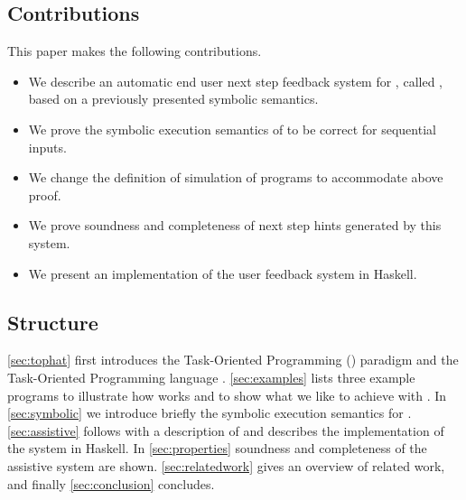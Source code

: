 \subsection{Contributions}

This paper makes the following contributions.

\begin{itemize}
  \item We describe an automatic end user next step feedback system for \TOPHAT, called \ASTOPHAT, based on a previously presented symbolic semantics.
  \item We prove the symbolic execution semantics of \TOPHAT to be correct for sequential inputs.
  \item We change the definition of simulation of \TOPHAT programs to accommodate above proof.
  \item We prove soundness and completeness of next step hints generated by this system.
  \item We present an implementation of the user feedback system in Haskell.
\end{itemize}


\subsection{Structure}

\cref{sec:tophat} first introduces the Task-Oriented Programming (\TOP) paradigm and the Task-Oriented Programming language \TOPHAT.
\cref{sec:examples} lists three example programs to illustrate how \TOPHAT works and to show what we like to achieve with \ASTOPHAT.
In \cref{sec:symbolic} we introduce briefly the symbolic execution semantics for \TOPHAT.
\cref{sec:assistive} follows with a description of \ASTOPHAT
and describes the implementation of the system in Haskell.
In \cref{sec:properties} soundness and completeness of the assistive system are shown.
\cref{sec:relatedwork} gives an overview of related work, and finally \cref{sec:conclusion} concludes.
